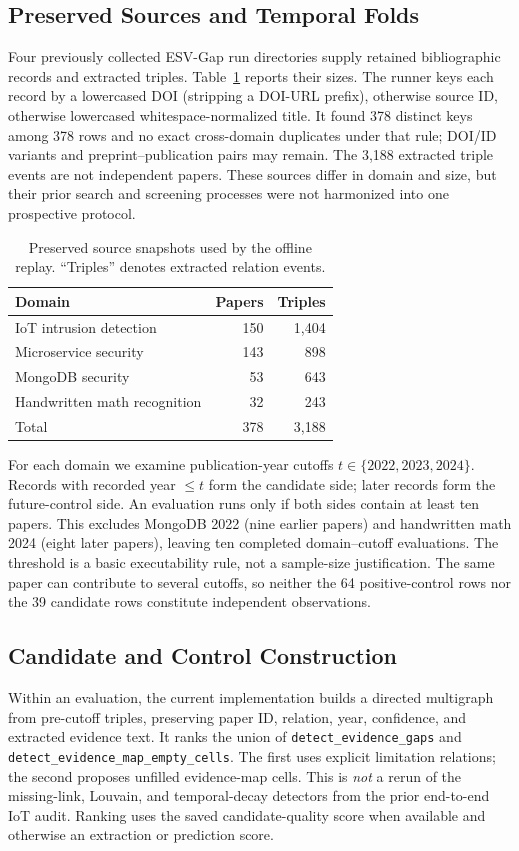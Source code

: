 \documentclass[conference,a4paper]{IEEEtran}
\begin{document}
\subsection{Preserved Sources and Temporal Folds}
Four previously collected ESV-Gap run directories supply retained bibliographic records and extracted triples. Table~\ref{tab:sources} reports their sizes. The runner keys each record by a lowercased DOI (stripping a DOI-URL prefix), otherwise source ID, otherwise lowercased whitespace-normalized title. It found 378 distinct keys among 378 rows and no exact cross-domain duplicates under that rule; DOI/ID variants and preprint--publication pairs may remain. The 3,188 extracted triple events are not independent papers. These sources differ in domain and size, but their prior search and screening processes were not harmonized into one prospective protocol.

\begin{table}[t]
\caption{Preserved source snapshots used by the offline replay. ``Triples'' denotes extracted relation events.}
\label{tab:sources}
\centering
\begin{tabular}{lrr}
\toprule
Domain & Papers & Triples \\
\midrule
IoT intrusion detection & 150 & 1,404 \\
Microservice security & 143 & 898 \\
MongoDB security & 53 & 643 \\
Handwritten math recognition & 32 & 243 \\
\midrule
Total & 378 & 3,188 \\
\bottomrule
\end{tabular}
\end{table}

For each domain we examine publication-year cutoffs $t\in\{2022,2023,2024\}$. Records with recorded year $\leq t$ form the candidate side; later records form the future-control side. An evaluation runs only if both sides contain at least ten papers. This excludes MongoDB 2022 (nine earlier papers) and handwritten math 2024 (eight later papers), leaving ten completed domain--cutoff evaluations. The threshold is a basic executability rule, not a sample-size justification. The same paper can contribute to several cutoffs, so neither the 64 positive-control rows nor the 39 candidate rows constitute independent observations.

\subsection{Candidate and Control Construction}
Within an evaluation, the current implementation builds a directed multigraph from pre-cutoff triples, preserving paper ID, relation, year, confidence, and extracted evidence text. It ranks the union of \texttt{detect\_evidence\_gaps} and \texttt{detect\_evidence\_map\_empty\_cells}. The first uses explicit limitation relations; the second proposes unfilled evidence-map cells. This is \emph{not} a rerun of the missing-link, Louvain, and temporal-decay detectors from the prior end-to-end IoT audit. Ranking uses the saved candidate-quality score when available and otherwise an extraction or prediction score.
\end{document}
